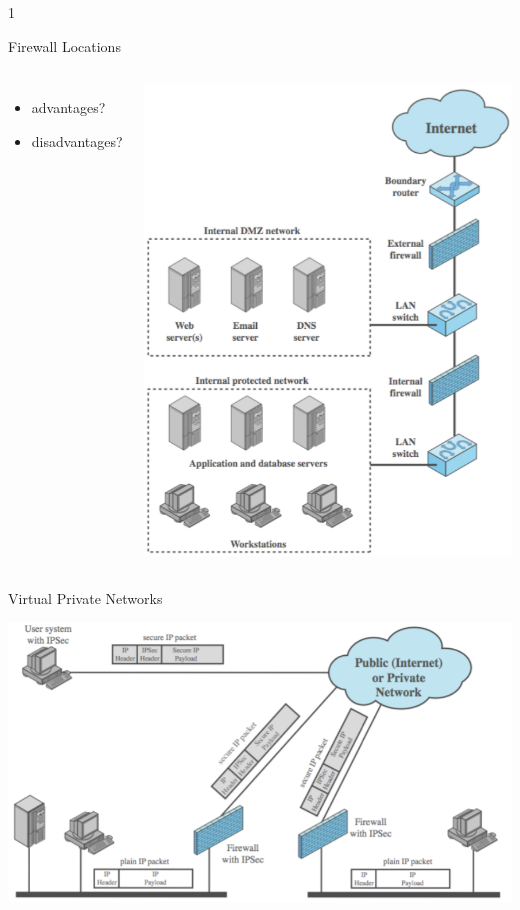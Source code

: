 1\documentclass{beamer}
\begin{document}
\begin{frame}{Firewall Locations}
  \begin{columns}[c]
     {
    \begin{itemize}
    \item advantages?
    \item disadvantages?
    \end{itemize}
    }
    \includegraphics[width=1\linewidth]{firewall-location}
  \end{columns}
\end{frame}

\begin{frame}{Virtual Private Networks}
  \begin{center}
    \includegraphics[width=1\linewidth]{vpn}
  \end{center}
\end{frame}
\end{document}

